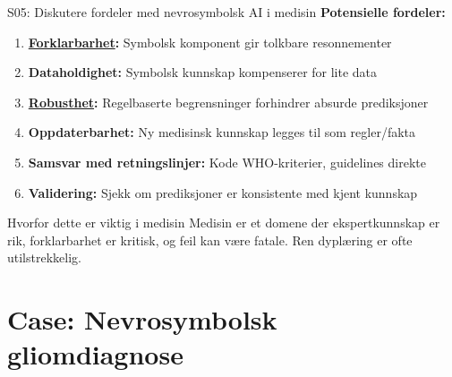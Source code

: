 \documentclass[aspectratio=169, 10pt]{beamer}
\begin{document}
\begin{frame}{S05: Diskutere fordeler med nevrosymbolsk AI i medisin}
    \textbf{Potensielle fordeler:}
    
    \vspace{0.3cm}
    \begin{enumerate}
        \item \textbf{\href{https://en.wikipedia.org/wiki/Explainable_artificial_intelligence}{Forklarbarhet}:} Symbolsk komponent gir tolkbare resonnementer
        
        \item \textbf{Dataholdighet:} Symbolsk kunnskap kompenserer for lite data
        
        \item \textbf{\href{https://en.wikipedia.org/wiki/Robustness_(computer_science)}{Robusthet}:} Regelbaserte begrensninger forhindrer absurde prediksjoner
        
        \item \textbf{Oppdaterbarhet:} Ny medisinsk kunnskap legges til som regler/fakta
        
        \item \textbf{Samsvar med retningslinjer:} Kode WHO-kriterier, guidelines direkte
        
        \item \textbf{Validering:} Sjekk om prediksjoner er konsistente med kjent kunnskap
    \end{enumerate}
    
    \vspace{0.3cm}
    \begin{alertblock}{Hvorfor dette er viktig i medisin}
        Medisin er et domene der ekspertkunnskap er rik, forklarbarhet er kritisk, og feil kan være fatale. Ren dyplæring er ofte utilstrekkelig.
    \end{alertblock}
\end{frame}

\section{Case: Nevrosymbolsk gliomdiagnose}
\end{document}
